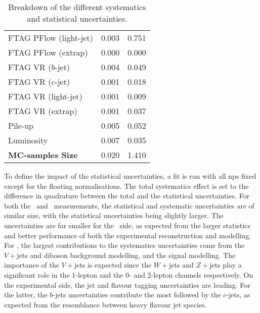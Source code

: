 \begin{table}[h!]
\begin{tabular}{l  C{2cm} C{2cm}}
        FTAG PFlow (light-jet)         &  0.003 & 0.751 \\
        FTAG PFlow (extrap)          &  0.000 & 0.000 \\
        FTAG VR ($b$-jet)            &  0.004 & 0.049 \\
        FTAG VR ($c$-jet)            &  0.001 & 0.018 \\
        FTAG VR (light-jet)            &  0.001 & 0.009 \\
        FTAG VR (extrap)             &  0.001 & 0.037 \\
        Pile-up                      &  0.005 & 0.052 \\
        Luminosity                   &  0.007 & 0.035 \\
        \hline
        \textbf{MC-samples Size}     &  0.020 & 1.410 \\
        \hline \hline
    \end{tabular}
    \caption{Breakdown of the different systematics and statistical uncertainties.}
    \label{tab:exp-breakdown}
\end{table}

To define the impact of the statistical uncertainties, a fit is run with all \gls{np}s fixed except for the floating normalisations. The total systematics effect is set to the difference in quadrature between the total and the statistical uncertainties. For both the \vhb\ and \vhc\ measurements, the statistical and systematic uncertainties are of similar size, with the statistical uncertainties being slightly larger. The uncertainties are far smaller for the \vhb\ side, as expected from the larger statistics and better performance of both the experimental reconstruction and modelling. For \vhb, the largest contributions to the systematics uncertainties come from the $V+$jets and diboson background modelling, and the signal modelling. The importance of the $V+$jets is expected since the $W+$jets and $Z+$jets play a significant role in the 1-lepton and the 0- and 2-lepton channels respectively. On the experimental side, the jet and flavour tagging uncertainties are leading. For the latter, the $b$-jets uncertainties contribute the most followed by the $c$-jets, as expected from the resemblance between heavy flavour jet species. \\


